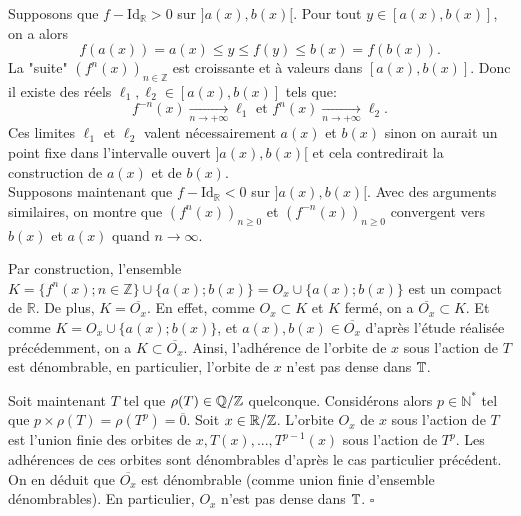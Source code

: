	Supposons que $f - \mathrm{Id_{\mathbb{R}}}>0$ sur $]a(x),b(x)[$. Pour tout $y \in [a(x),b(x)]$, on a alors $$f(a(x))= a(x) \leq y \leq f(y) \leq b(x) =f(b(x)).$$
	La "suite" $(f^n(x))_{n\in \mathbb{Z}}$ est croissante et à valeurs dans $[a(x),b(x)]$. Donc il existe des réels $\ell_1, \ell_2\in [a(x),b(x)]$ tels que:
	$$f^{-n}(x) \underset{n \to + \infty}{\longrightarrow} \ell_1\text{ et }f^{n}(x) \underset{n \to + \infty}{\longrightarrow} \ell_2.$$
	 Ces limites $\ell_1$ et $\ell_2$ valent nécessairement $a(x)$ et $b(x)$ sinon on aurait un point fixe dans l'intervalle ouvert $]a(x),b(x)[$ et cela contredirait la construction de $a(x)$ et de $b(x)$.\\

	Supposons maintenant que $f - \mathrm{Id_{\mathbb{R}}}<0$ sur $]a(x),b(x)[$. Avec des arguments similaires, on montre que $(f^n(x))_{n\geq 0}$ et $(f^{-n}(x))_{n\geq 0}$ convergent vers $b(x)$ et $a(x)$ quand $n \to \infty$.\\

	\par Par construction, l'ensemble $K=\lbrace f^n(x); n \in \mathbb{Z}\rbrace \cup \lbrace a(x); b(x)\rbrace = O_x \cup \lbrace a(x); b(x)\rbrace$ est un compact de $\mathbb{R}$. De plus, $K = \overline{O_x}$. En effet, comme $O_x \subset K$ et $K$ fermé, on a $\overline{O_x}\subset K$. Et comme $K=O_x \cup \lbrace a(x); b(x)\rbrace$, et $a(x), b(x) \in \overline{O_x}$ d'après l'étude réalisée précédemment, on a $K \subset \overline{O_x} $. Ainsi, l'adhérence de l'orbite de $x$ sous l'action de $T$ est dénombrable, en particulier, l'orbite de $x$ n'est pas dense dans ${\mathbb{T}}$.\\



	\par Soit maintenant $T$ tel que $\rho(T) \in \mathbb{Q}/\mathbb{Z}$ quelconque. Considérons alors $p \in \mathbb{N}^*$ tel que $p \times \rho(T)= \rho(T^p)= \overline{0}$. Soit $x \in {\mathbb{R}}/\mathbb{Z}$. L'orbite $O_x$ de $x$ sous l'action de $T$ est l'union finie des orbites de $x, T(x), ... ,T^{p-1}(x)$ sous l'action de $T^p$. Les adhérences de ces orbites sont dénombrables d'après le cas particulier précédent. On en déduit que $\overline{O_x}$ est dénombrable (comme union finie d'ensemble dénombrables). En particulier, $O_x$ n'est pas dense dans ${\mathbb{T}}$.  \hfill $\square$\\







